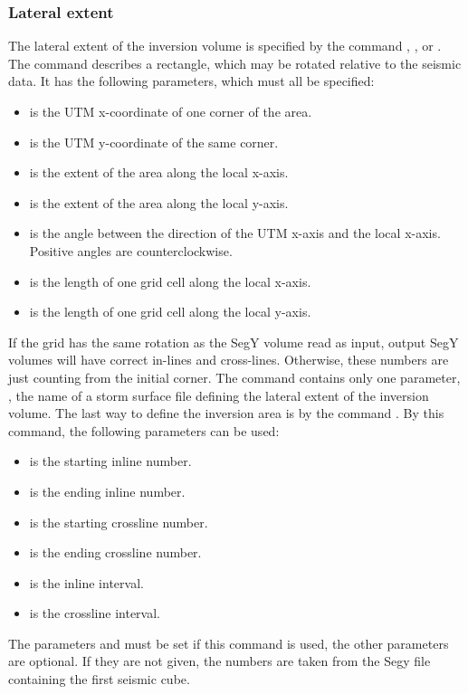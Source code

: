 \subsubsection{Lateral extent}
The lateral extent of the inversion volume is specified by the command
,
, or
. The 
command  describes a rectangle, which may be
rotated relative to the seismic data. It has the following parameters,
which must all be specified: 
\begin{itemize}
\item {} is the UTM x-coordinate of one corner of the area.
\item {} is the UTM y-coordinate of the same corner.
\item {} is the extent of the area along the local x-axis.
\item {} is the extent of the area along the local y-axis.
\item {} is the angle between the direction of the UTM x-axis and the local x-axis. Positive angles are counterclockwise.
\item {} is the length of one grid cell along the local x-axis.
\item {} is the length of one grid cell along the local y-axis.
\end{itemize}
If the grid has the same rotation as the SegY volume read as input, output SegY volumes will have correct in-lines and cross-lines. Otherwise, these numbers are just counting from the initial corner.
The command  contains only one parameter, , the name of a storm surface file defining the lateral extent of the inversion volume.
The last way to define the inversion area is by the command . By this command, the following parameters can be used:
\begin{itemize}
\item {} is the starting inline number.
\item {} is the ending inline number.
\item {} is the starting crossline number.
\item {} is the ending crossline number.
\item {} is the inline interval.
\item {} is the crossline interval.
\end{itemize}
The parameters  and  must be set if this command is used, the other parameters are optional. If they are not given, the numbers are taken from the Segy file containing the first seismic cube.

